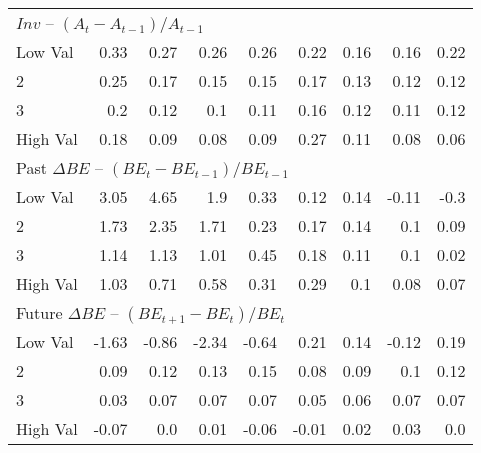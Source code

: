 \begin{table}[!ht]
\begin{tabular}{lrrrrrrrr}
    \multicolumn{9}{l}{$Inv$ -- $(A_t - A_{t-1}) / A_{t-1}$} \\
    Low Val    & 0.33  & 0.27  & 0.26  & 0.26  & 0.22  & 0.16  & 0.16  & 0.22  \\
           2   & 0.25  & 0.17  & 0.15  & 0.15  & 0.17  & 0.13  & 0.12  & 0.12  \\
           3   & 0.2  & 0.12  & 0.1  & 0.11  & 0.16  & 0.12  & 0.11  & 0.12  \\
    High Val   & 0.18  & 0.09  & 0.08  & 0.09  & 0.27  & 0.11  & 0.08  & 0.06  \\
    [1em]
  

    \multicolumn{9}{l}{Past $\Delta BE$ -- $(BE_t - BE_{t-1}) / BE_{t-1}$} \\
    Low Val    & 3.05  & 4.65  & 1.9  & 0.33  & 0.12  & 0.14  & -0.11  & -0.3  \\
           2   & 1.73  & 2.35  & 1.71  & 0.23  & 0.17  & 0.14  & 0.1  & 0.09  \\
           3   & 1.14  & 1.13  & 1.01  & 0.45  & 0.18  & 0.11  & 0.1  & 0.02  \\
    High Val   & 1.03  & 0.71  & 0.58  & 0.31  & 0.29  & 0.1  & 0.08  & 0.07  \\
    [1em]
  

    \multicolumn{9}{l}{Future $\Delta BE$ -- $(BE_{t+1} - BE_t) / BE_t$} \\
    Low Val    & -1.63  & -0.86  & -2.34  & -0.64  & 0.21  & 0.14  & -0.12  & 0.19  \\
           2   & 0.09  & 0.12  & 0.13  & 0.15  & 0.08  & 0.09  & 0.1  & 0.12  \\
           3   & 0.03  & 0.07  & 0.07  & 0.07  & 0.05  & 0.06  & 0.07  & 0.07  \\
    High Val   & -0.07  & 0.0  & 0.01  & -0.06  & -0.01  & 0.02  & 0.03  & 0.0  \\
    [1em]
  

  \bottomrule
\end{tabular}
\label{tbl:32_Size_BM_Prior_Sorts}
\end{table}